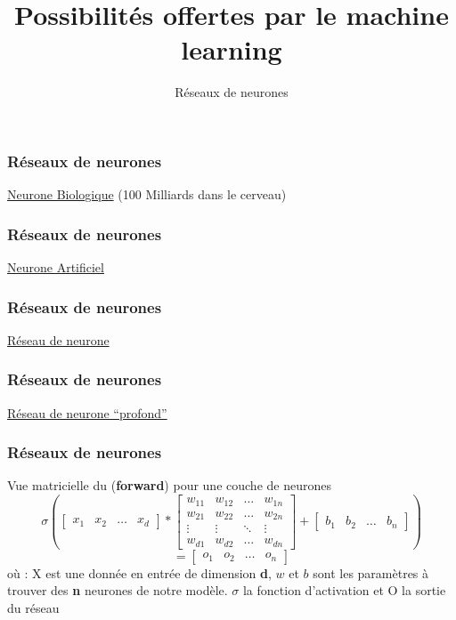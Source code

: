 \documentclass{formation}
\title{Possibilités offertes par le machine learning}
\subtitle{Réseaux de neurones}
\begin{document}
\maketitle

\begin{frame}
  \frametitle{Réseaux de neurones}
  \begin{center}
    \underline{Neurone Biologique} (100 Milliards dans le cerveau)
  \end{center}
\end{frame}

\begin{frame}
  \frametitle{Réseaux de neurones}
  \begin{center}
    \underline{Neurone Artificiel}
  \end{center}
\end{frame}

\begin{frame}
  \frametitle{Réseaux de neurones}
  \begin{center}
    \underline{Réseau de neurone}
  \end{center}
\end{frame}

\begin{frame}
  \frametitle{Réseaux de neurones}
  \begin{center}
    \underline{Réseau de neurone ``profond''}
  \end{center}
\end{frame}

\begin{frame}
  \frametitle{Réseaux de neurones}
  Vue matricielle du (\textbf{forward}) pour une couche de neurones
  \[
  \sigma \left(
  \begin{bmatrix}
    x_{1} & x_{2} & \dots & x_{d}
  \end{bmatrix}
  *
  \begin{bmatrix}
    w_{11} & w_{12} & \dots  & w_{1n} \\
    w_{21} & w_{22} & \dots  & w_{2n} \\
    \vdots & \vdots & \ddots & \vdots \\
    w_{d1} & w_{d2} & \dots  & w_{dn}
  \end{bmatrix}
  +
  \begin{bmatrix}
    b_{1} & b_{2} & \dots & b_{n}
  \end{bmatrix}
  \right )
  \]
  \[
  =
  \begin{bmatrix}
    o_{1} & o_{2} & \dots & o_{n}
  \end{bmatrix}
  \]
  \newline
  où :
  \newline
  X est une donnée en entrée de dimension \textbf{d},
  \newline
  $w$ et $b$ sont les paramètres à trouver des \textbf{n} neurones de notre modèle.
  \newline
  $\sigma$ la fonction d'activation et
  \newline
  O la sortie du réseau
\end{frame}
\end{document}
